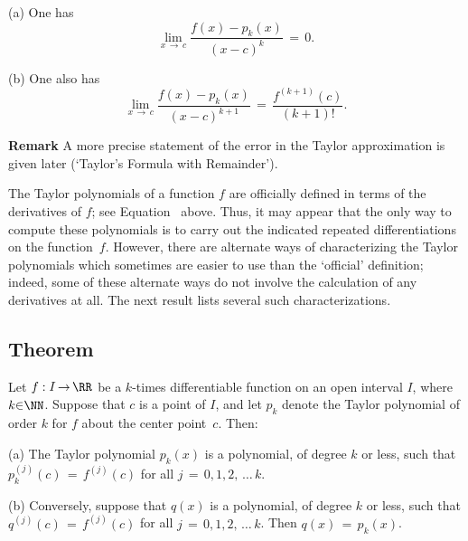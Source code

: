 {\V


        (a) One has
        \begin{displaymath}
        \lim_{x \,{\rightarrow}\, c} \frac{f(x)-p_{k}(x)}{(x-c)^{k}} \,=\, 0.
        \end{displaymath}

\V

        (b) One also has
        \begin{displaymath}
        \lim_{x \,{\rightarrow}\, c} \frac{f(x)-p_{k}(x)}{(x-c)^{k+1}} \,=\, \frac{f^{(k+1)}(c)}{(k+1)!}.
        \end{displaymath}

\V

        {\bf Remark} A more precise statement of the error in the Taylor approximation is given later (`Taylor's Formula with Remainder').


\VV


        The Taylor polynomials of a function $f$ are officially defined in terms of the derivatives of $f$; see Equation~ above.
    Thus, it may appear that the only way to compute these polynomials is to carry out the indicated repeated differentiations on the function~$f$.
    However, there are alternate ways of characterizing the Taylor polynomials which sometimes are easier to use than the `official' definition;
    indeed, some of these alternate ways do not involve the calculation of any derivatives at all.
    The next result lists several such characterizations.

\V

            \subsection{\small{\bf Theorem}}
            \label{ThmE60.40}
\V

        Let $f:I \,{\rightarrow}\, {\RR}$ be a $k$-times differentiable function on an open interval $I$, where $k{\in}{\NN}$.
    Suppose that $c$ is a point of $I$, and let $p_{k}$ denote the Taylor polynomial of order $k$ for $f$ about the center point~$c$.
    Then:

        (a) The Taylor polynomial $p_{k}(x)$ is a polynomial, of degree $k$ or less, such that $p_{k}^{(j)}(c) \,=\, f^{(j)}(c)$ for all $j \,=\, 0,1,2, \,{\ldots}\, k$.

\V

        (b) Conversely, suppose that $q(x)$ is a polynomial, of degree $k$ or less, such that $q^{(j)}(c) \,=\, f^{(j)}(c)$ for all $j \,=\, 0,1,2, \,{\ldots}\, k$.
    Then $q(x) \,=\, p_{k}(x)$.

}
